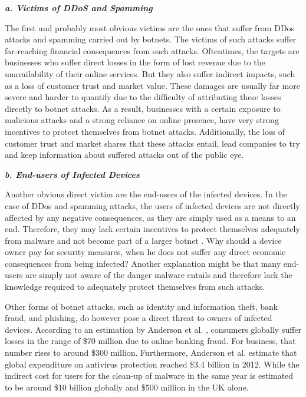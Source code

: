 			\textbf{\textit{a. Victims of DDoS and Spamming}}
			
			The first and probably most obvious victims are the ones that suffer from DDos attacks and spamming carried out by botnets. The victims of such attacks suffer far-reaching financial consequences from such attacks. Oftentimes, the targets are businesses who suffer direct losses in the form of lost revenue due to the unavailability of their online services. But they also suffer indirect impacts, such as a loss of customer trust and market value. These damages are usually far more severe \cite{Anderson13} and harder to quantify due to the difficulty of attributing these losses directly to botnet attacks. As a result, businesses with a certain exposure to malicious attacks and a strong reliance on online presence, have very strong incentives to protect themselves from botnet attacks. Additionally, the loss of customer trust and market shares that these attacks entail, lead companies to try and keep information about suffered attacks out of the public eye.

			\textbf{\textit{b. End-users of Infected Devices}}
			
			Another obvious direct victim are the end-users of the infected devices. In the case of DDos and spamming attacks, the users of infected devices are not directly affected by any negative consequences, as they are simply used as a means to an end. Therefore, they may lack certain incentives to protect themselves adequately from malware and not become part of a larger botnet \cite{Asghari15}. Why should a device owner pay for security measures, when he does not suffer any direct economic consequences from being infected? Another explanation might be that many end-users are simply not aware of the danger malware entails and therefore lack the knowledge required to adequately protect themselves from such attacks.

Other forms of botnet attacks, such as identity and information theft, bank fraud, and phishing, do however pose a direct threat to owners of infected devices. According to an estimation by Anderson et al. \cite{Anderson13}, consumers globally suffer losses in the range of \$70 million due to online banking fraud. For business, that number rises to around \$300 million. Furthermore, Anderson et al. \cite{Anderson13} estimate that global expenditure on antivirus protection reached \$3.4 billion in 2012. While the indirect cost for users for the clean-up of malware in the same year is estimated to be around \$10 billion globally and \$500 million in the UK alone.

